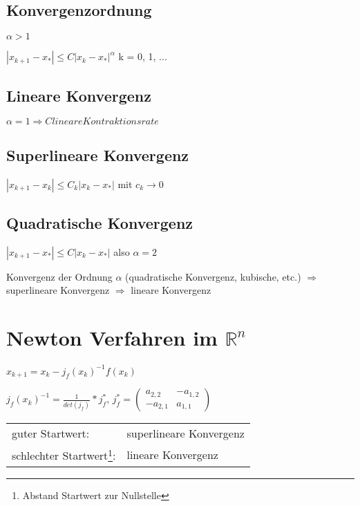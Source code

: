 \documentclass[12pt,a4paper]{article} %
\newcommand*\tab[1][1cm]{\hspace*{#1}}
\begin{document}
	\subsection{Konvergenzordnung}
	
	$\alpha > 1$
	
	$|x_{k + 1} - x_*| \le C|x_k - x_*|^\alpha$ \tab k = 0, 1, ...
	
	\subsection{Lineare Konvergenz}
	
	$\alpha = 1 \Rightarrow C lineare Kontraktionsrate$
	
	\subsection{Superlineare Konvergenz}
	
	$|x_{k + 1} - x_k| \le C_k |x_k - x_*|$ \tab mit $c_k \rightarrow 0$
	
	\subsection{Quadratische Konvergenz}
	
	$|x_{k + 1} - x_*| \le C |x_k - x_*|$ \tab also $\alpha = 2$
	
	Konvergenz der Ordnung $\alpha$ (quadratische Konvergenz, kubische, etc.) $\Rightarrow$ superlineare Konvergenz $\Rightarrow$ lineare Konvergenz
	
	\newpage
	
	\section{Newton Verfahren im \texorpdfstring{$\mathbb{R}^n$}{R pow(n)}}
	
	$x_{k + 1} = x_k - j_f(x_k)^{-1}f(x_k)$
	
	$j_f(x_k)^{-1} = \frac{1}{det(j_f)} * j_f^*$, 
	$j_f^* = 
	\begin{pmatrix}
		a_{2, 2} & -a_{1, 2} \\
		-a_{2, 1} & a_{1, 1}
	\end{pmatrix}$
	
	\begin{tabular}{l l}
		guter Startwert: & superlineare Konvergenz \\		
		schlechter Startwert\footnote{Abstand Startwert zur Nullstelle}: & lineare Konvergenz
	\end{tabular}
	
\end{document}
